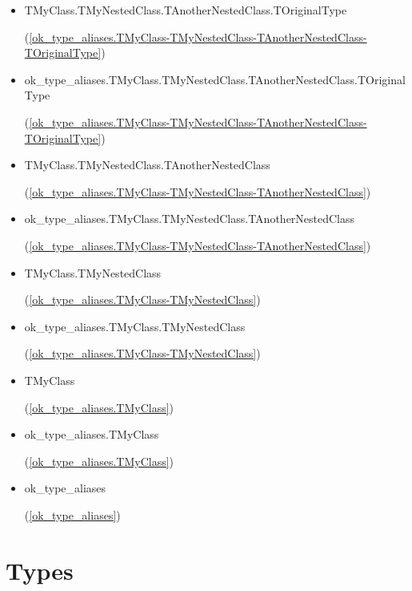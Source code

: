 \documentclass{report}
\begin{document}
\begin{list}{}
\begin{itemize}
\item \begin{ttfamily}TMyClass.TMyNestedClass.TAnotherNestedClass.TOriginalType\end{ttfamily}(\ref{ok_type_aliases.TMyClass-TMyNestedClass-TAnotherNestedClass-TOriginalType})
\item \begin{ttfamily}ok{\_}type{\_}aliases.TMyClass.TMyNestedClass.TAnotherNestedClass.TOriginalType\end{ttfamily}(\ref{ok_type_aliases.TMyClass-TMyNestedClass-TAnotherNestedClass-TOriginalType})
\item \begin{ttfamily}TMyClass.TMyNestedClass.TAnotherNestedClass\end{ttfamily}(\ref{ok_type_aliases.TMyClass-TMyNestedClass-TAnotherNestedClass})
\item \begin{ttfamily}ok{\_}type{\_}aliases.TMyClass.TMyNestedClass.TAnotherNestedClass\end{ttfamily}(\ref{ok_type_aliases.TMyClass-TMyNestedClass-TAnotherNestedClass})
\item \begin{ttfamily}TMyClass.TMyNestedClass\end{ttfamily}(\ref{ok_type_aliases.TMyClass-TMyNestedClass})
\item \begin{ttfamily}ok{\_}type{\_}aliases.TMyClass.TMyNestedClass\end{ttfamily}(\ref{ok_type_aliases.TMyClass-TMyNestedClass})
\item \begin{ttfamily}TMyClass\end{ttfamily}(\ref{ok_type_aliases.TMyClass})
\item \begin{ttfamily}ok{\_}type{\_}aliases.TMyClass\end{ttfamily}(\ref{ok_type_aliases.TMyClass})
\item \begin{ttfamily}ok{\_}type{\_}aliases\end{ttfamily}(\ref{ok_type_aliases})
\end{itemize}

\end{list}
\section{Types}
\end{document}

